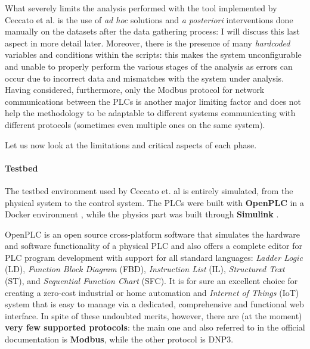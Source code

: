 \bigskip
What severely limits the analysis performed with the tool implemented by Ceccato et al. is the use of \textit{ad hoc} solutions and \textit{a posteriori} interventions done manually on the datasets after the data gathering process: I will discuss this last aspect in more detail later.\newline
Moreover, there is the presence of many \textit{hardcoded} variables and conditions within the scripts: this makes the system unconfigurable and unable to properly perform the various stages of the analysis as errors can occur due to incorrect data and mismatches with the system under analysis.\newline
Having considered, furthermore, only the Modbus protocol for network communications between the PLCs is another major limiting factor and does not help the methodology to be adaptable to different systems communicating with different protocols (sometimes even multiple ones on the same system). 

\bigskip
Let us now look at the limitations and critical aspects of each phase.

\paragraph{Testbed}
\label{par:3_testbed_limitations}
The testbed environment used by Ceccato et. al is entirely simulated, from the physical system to the control system. The PLCs were built with \textbf{OpenPLC} \cite{openplc} in a Docker environment \cite{docker}, while the physics part was built through \textbf{Simulink} \cite{simulink}.

\bigskip
OpenPLC is an open source cross-platform software that simulates the hardware and software functionality of a physical PLC and also offers a complete editor for PLC program development with support for all standard languages: \textit{Ladder Logic} (LD), \textit{Function Block Diagram} (FBD), \textit{Instruction List} (IL), \textit{Structured Text} (ST), and \textit{Sequential Function Chart} (SFC).\newline
It is for sure an excellent choice for creating a zero-cost industrial or home automation and \textit{Internet of Things} (IoT) system that is easy to manage via a dedicated, comprehensive and functional web interface. In spite of these undoubted merits, however, there are (at the moment) \textbf{very few supported protocols}: the main one and also referred to in the official documentation is \textbf{Modbus}, while the other protocol is DNP3.

